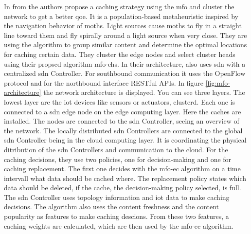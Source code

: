 \documentclass[conference]{IEEEtran}
\begin{document}
	In \cite{caching-1} from \citeyear{caching-1} the authors propose a caching strategy using the \acf{mfo} and cluster the network to get a better \acf{qoe}. It is a population-based metaheuristic inspired by the navigation behavior of moths. Light sources cause moths to fly in a straight line toward them and fly spirally around a light source when very close. They are using the algorithm to group similar content and determine the optimal locations for caching certain data. They cluster the edge nodes and select cluster heads using their propsed algorithm \ac{mfo-chs}.
	In their architecture, also uses \ac{sdn} with a centralized \ac{sdn} Controller. For southbound communication it uses the OpenFlow protocol and for the northbound interface RESTful APIs. In figure \ref{fig:mfo-architecture} the network architecture is displayed. You can see three layers. The lowest layer are the \ac{iot} devices like sensors or actuators, clusterd. Each one is connected to a \ac{sdn} edge node on the edge computing layer. Here the caches are installed. The nodes are connected to the \ac{sdn} Controller, seeing an overview of the network. The locally distributed \ac{sdn} Controllers are connected to the global \ac{sdn} Controller being in the cloud computing layer. It is coordinating the physical ditribution of the \ac{sdn} Controllers and communication to the cloud. 
	For the caching decisions, they use two policies, one for decision-making and one for caching replacement. The first one decides with the \ac{mfo-ec} algorithm on a time intervall what data should be cached where. The replacement policy states which data should be deleted, if the cache, the decision-making policy selected, is full. The \ac{sdn} Controller uses topology information and \ac{iot} data to make caching decisions. The algorithm also uses the content freshness and the content popularity as features to make caching descions. From these two features, a caching weights are calculated, which are then used by the \ac{mfo-ec} algorithm. 
\end{document}
